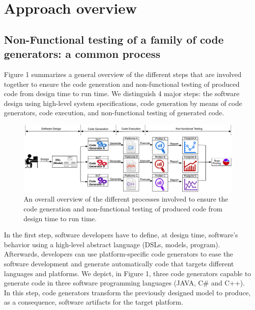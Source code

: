


\section{Approach overview}


\subsection{Non-Functional  testing of a family of code generators: a common process}

Figure 1 summarizes a general overview of the different steps that are involved together to ensure the code generation and non-functional testing of produced code from design time to run time. We distinguish 4 major steps: the software design using high-level system specifications, code generation by means of code generators, code execution, and non-functional testing of generated code. 


\begin{figure}[t]
	\includegraphics[width=1\linewidth]{Ressources/background.pdf}
	\caption{An overall overview of the different processes involved to ensure the code generation and non-functional testing of produced code from design time to run time.}
\end{figure}


In the first step, software developers have to define, at design time, software's behavior using a high-level abstract language (DSLs, models, program). Afterwards, developers can use platform-specific code generators to ease the software development and generate automatically code that targets different languages and platforms. We depict, in Figure 1, three code generators capable to generate code in three software programming languages (JAVA, C\# and C++). In this step, code generators transform the previously designed model to produce, as a consequence, software artifacts for the target platform.

